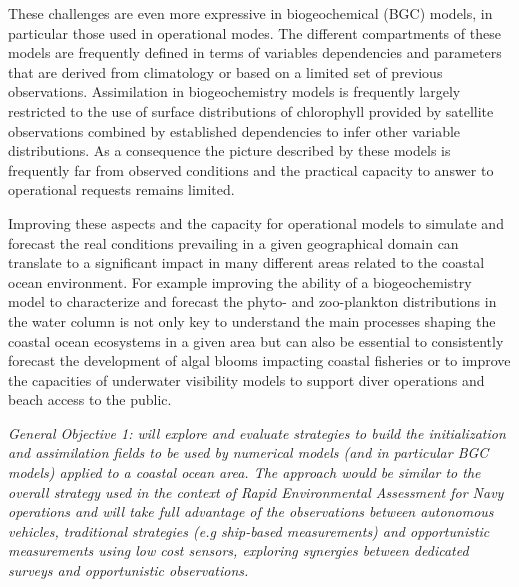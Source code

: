 These challenges are even more expressive in biogeochemical (BGC)
models, in particular those used in operational modes. The different
compartments of these models are frequently defined in terms of
variables dependencies and parameters that are derived from
climatology or based on a limited set of previous
observations. Assimilation in biogeochemistry models is frequently
largely restricted to the use of surface distributions of chlorophyll
provided by satellite observations combined by established
dependencies to infer other variable distributions. As a consequence
the picture described by these models is frequently far from observed
conditions and the practical capacity to answer to operational
requests remains limited.
 
Improving these aspects and the capacity for operational models to
simulate and forecast the real conditions prevailing in a given
geographical domain can translate to a significant impact in many
different areas related to the coastal ocean environment. For example
improving the ability of a biogeochemistry model to characterize and
forecast the phyto- and zoo-plankton distributions in the water column
is not only key to understand the main processes shaping the coastal
ocean ecosystems in a given area but can also be essential to
consistently forecast the development of algal blooms impacting
coastal fisheries or to improve the capacities of underwater
visibility models to support diver operations and beach access to the
public.
 
\emph{General Objective 1: \proj will explore and evaluate strategies
  to build the initialization and assimilation fields to be used by
  numerical models (and in particular BGC models) applied to a coastal
  ocean area. The approach would be similar to the overall strategy
  used in the context of Rapid Environmental Assessment for Navy
  operations and will take full advantage of the observations between
  autonomous vehicles, traditional strategies (e.g ship-based
  measurements) and opportunistic measurements using low cost sensors,
  exploring synergies between dedicated surveys and opportunistic
  observations.}
 
